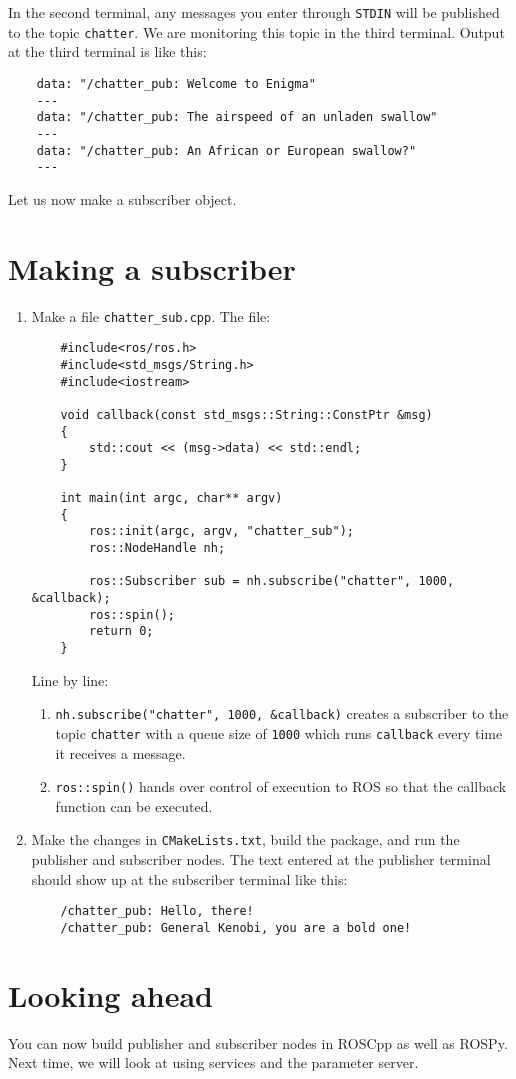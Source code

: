 \documentclass{article}
\begin{document}
\begin{enumerate}
            In the second terminal, any messages you enter through \texttt{STDIN} will be 
            published to the topic \texttt{chatter}. We are monitoring this topic in the third 
            terminal. Output at the third terminal is like this:
            \begin{verbatim}
    data: "/chatter_pub: Welcome to Enigma"
    ---
    data: "/chatter_pub: The airspeed of an unladen swallow"
    ---
    data: "/chatter_pub: An African or European swallow?"
    ---    
            \end{verbatim}
            Let us now make a subscriber object.
        \end{enumerate}
    \section{Making a subscriber}
        \begin{enumerate}
            \item Make a file \texttt{chatter\_sub.cpp}. The file:
            \begin{verbatim}
    #include<ros/ros.h>
    #include<std_msgs/String.h>
    #include<iostream>

    void callback(const std_msgs::String::ConstPtr &msg)
    {
        std::cout << (msg->data) << std::endl;
    }

    int main(int argc, char** argv)
    {
        ros::init(argc, argv, "chatter_sub");
        ros::NodeHandle nh;

        ros::Subscriber sub = nh.subscribe("chatter", 1000, &callback);
        ros::spin();
        return 0;
    }
            \end{verbatim}
            Line by line:
            \begin{enumerate}
                \item \texttt{nh.subscribe("chatter", 1000, &callback)} creates
                a subscriber to the topic \texttt{chatter} with a queue size of \texttt{1000}
                which runs \texttt{callback} every time it receives a message.
                \item \texttt{ros::spin()} hands over control of execution to ROS so 
                that the callback function can be executed.
            \end{enumerate}
            \item Make the changes in \texttt{CMakeLists.txt}, build the package, and run the publisher
            and subscriber nodes. The text entered at the publisher terminal should show up at the subscriber
            terminal like this:
            \begin{verbatim}
    /chatter_pub: Hello, there!
    /chatter_pub: General Kenobi, you are a bold one!
            \end{verbatim}
        \end{enumerate}
        \section{Looking ahead}
        You can now build publisher and subscriber nodes in ROSCpp as well as ROSPy. Next time,
        we will look at using services and the parameter server.
\end{document}
